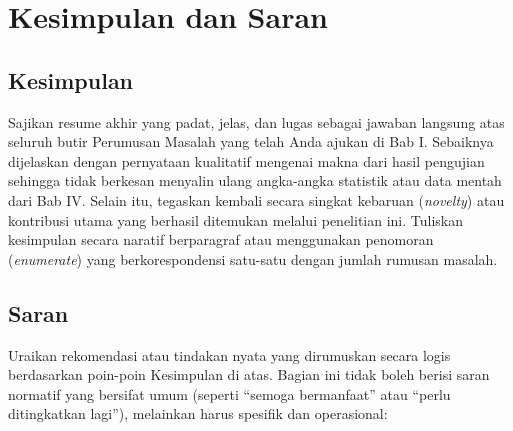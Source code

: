 \chapter{Kesimpulan dan Saran}



\section{Kesimpulan}

Sajikan resume akhir yang padat, jelas, dan lugas sebagai jawaban langsung atas seluruh butir Perumusan Masalah yang telah Anda ajukan di Bab I. Sebaiknya dijelaskan dengan pernyataan kualitatif mengenai makna dari hasil pengujian sehingga tidak berkesan menyalin ulang angka-angka statistik atau data mentah dari Bab IV. Selain itu, tegaskan kembali secara singkat kebaruan (\textit{novelty}) atau kontribusi utama yang berhasil ditemukan melalui penelitian ini. Tuliskan kesimpulan secara naratif berparagraf atau menggunakan penomoran (\textit{enumerate}) yang berkorespondensi satu-satu dengan jumlah rumusan masalah.



\section{Saran}

Uraikan rekomendasi atau tindakan nyata yang dirumuskan secara logis berdasarkan poin-poin Kesimpulan di atas. Bagian ini tidak boleh berisi saran normatif yang bersifat umum (seperti ``semoga bermanfaat'' atau ``perlu ditingkatkan lagi''), melainkan harus spesifik dan operasional:


